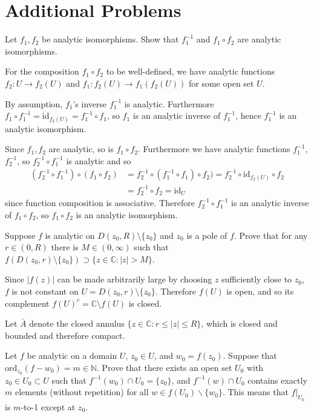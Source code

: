 \documentclass{article}
\newcommand\id{\mathrm{id}}
\newcommand\ord{\mathrm{ord}}
\newcounter{Problem}
\newenvironment{Problem}{\begin{Exercise}[name={Problem},
                                          counter={Problem}]}
                        {\end{Exercise}}
\begin{document}
\section{Additional Problems}
\begin{Problem}
Let $f_1, f_2$ be analytic isomorphisms. Show that
$f_1^{-1}$ and $f_1 \circ f_2$ are analytic isomorphisms.
\end{Problem}

\begin{Answer}
For the composition $f_1 \circ f_2$ to be well-defined,
we have analytic functions $f_2 : U \to f_2(U)$ and
$f_1 : f_2(U) \to f_1(f_2(U))$ for some open set $U$.

By assumption, $f_1$'s inverse $f_1^{-1}$ is analytic.
Furthermore $f_1 \circ f_1^{-1} = \id_{f_2(U)} = f_1^{-1} \circ f_1$,
so $f_1$ is an analytic inverse of $f_1^{-1}$, hence
$f_1^{-1}$ is an analytic isomorphism.

Since $f_1, f_2$ are analytic, so is $f_1 \circ f_2$.
Furthermore we have analytic functions $f_1^{-1}$, $f_2^{-1}$,
so $f_2^{-1} \circ f_1^{-1}$ is analytic and so
\begin{align*}
  (f_2^{-1} \circ f_1^{-1}) \circ (f_1 \circ f_2)
&= f_2^{-1} \circ (f_1^{-1} \circ f_1) \circ f_2)
 = f_2^{-1} \circ \id_{f_2(U)} \circ f_2 \\
&= f_2^{-1} \circ f_2
 = \id_U
\end{align*}
since function composition is associative. Therefore
$f_2^{-1} \circ f_1^{-1}$ is an analytic inverse of $f_1 \circ f_2$,
so $f_1 \circ f_2$ is an analytic isomorphism.
\end{Answer}

\begin{Problem}
Suppose $f$ is analytic on $D(z_0, R) \setminus \{ z_0 \}$
and $z_0$ is a pole of $f$. Prove that for any $r \in (0, R)$
there is $M \in (0, \infty)$ such that
$f(D(z_0, r) \setminus \{z_0\})
 \supset
 \{ z \in \mathbb{C} : |z| > M \}$.
\end{Problem}

\begin{Answer}
Since $|f(z)|$ can be made arbitrarily large by choosing
$z$ sufficiently close to $z_0$, $f$ is not constant on
$U = D(z_0, r) \setminus \{ z_0 \}$. Therefore $f(U)$ is open,
and so its complement $f(U)^c = \mathbb{C} \setminus f(U)$ is closed.

Let $\bar{A}$ denote the closed annulus
$\{ z \in \mathbb{C} : r \leq |z| \leq R \}$, which is closed and
bounded and therefore compact.
\end{Answer}

\begin{Problem}
Let $f$ be analytic on a domain $U$, $z_0 \in U$, and $w_0 = f(z_0)$.
Suppose that $\ord_{z_0} (f - w_0) = m \in \mathbb{N}$. Prove that
there exists an open set $U_0$ with $z_0 \in U_0 \subset U$ such that
$f^{-1}(w_0) \cap U_0 = \{ z_0 \}$, and $f^{-1}(w) \cap U_0$ contains
exactly $m$ elements (without repetition) for all
$w \in f(U_0) \backslash \{ w_0 \}$. This means that $f|_{U_0}$ is
$m$-to-1 except at $z_0$.
\end{Problem}
\end{document}
